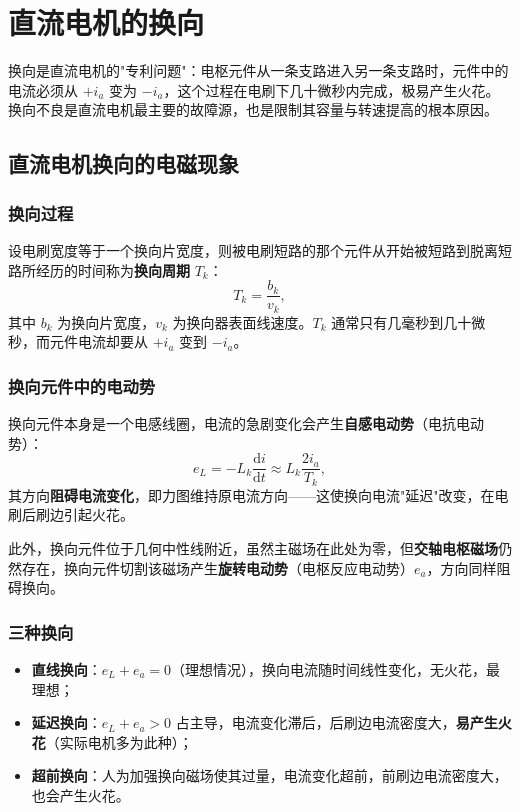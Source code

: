 \chapter{直流电机的换向}

换向是直流电机的"专利问题"：电枢元件从一条支路进入另一条支路时，元件中的电流必须从 $+i_a$ 变为 $-i_a$，这个过程在电刷下几十微秒内完成，极易产生火花。换向不良是直流电机最主要的故障源，也是限制其容量与转速提高的根本原因。

\section{直流电机换向的电磁现象}

\subsection{换向过程}
设电刷宽度等于一个换向片宽度，则被电刷短路的那个元件从开始被短路到脱离短路所经历的时间称为\textbf{换向周期} $T_k$：
\begin{equation}
T_k=\frac{b_k}{v_k},
\end{equation}
其中 $b_k$ 为换向片宽度，$v_k$ 为换向器表面线速度。$T_k$ 通常只有几毫秒到几十微秒，而元件电流却要从 $+i_a$ 变到 $-i_a$。

\subsection{换向元件中的电动势}
换向元件本身是一个电感线圈，电流的急剧变化会产生\textbf{自感电动势}（电抗电动势）：
\begin{equation}
e_L=-L_k\frac{\mathrm{d}i}{\mathrm{d}t}\approx L_k\frac{2i_a}{T_k},
\end{equation}
其方向\textbf{阻碍电流变化}，即力图维持原电流方向——这使换向电流"延迟"改变，在电刷后刷边引起火花。

此外，换向元件位于几何中性线附近，虽然主磁场在此处为零，但\textbf{交轴电枢磁场}仍然存在，换向元件切割该磁场产生\textbf{旋转电动势}（电枢反应电动势）$e_a$，方向同样阻碍换向。

\subsection{三种换向}
\begin{itemize}
  \item \textbf{直线换向}：$e_L+e_a=0$（理想情况），换向电流随时间线性变化，无火花，最理想；
  \item \textbf{延迟换向}：$e_L+e_a>0$ 占主导，电流变化滞后，后刷边电流密度大，\textbf{易产生火花}（实际电机多为此种）；
  \item \textbf{超前换向}：人为加强换向磁场使其过量，电流变化超前，前刷边电流密度大，也会产生火花。
\end{itemize}

